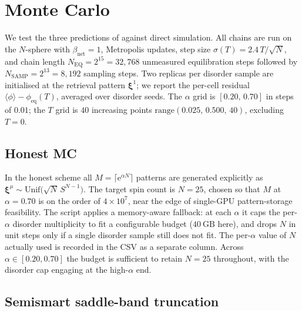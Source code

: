 \documentclass[11pt]{article}
\newcommand{\bxi}{\boldsymbol{\xi}}
\newcommand{\avg}[1]{\langle #1 \rangle}
\newcommand{\e}{{\mathrm{e}}}
\newcommand{\Bnet}{\beta_{\mathrm{net}}}
\newcommand{\phieq}{\phi_{\mathrm{eq}}}
\begin{document}
\section{Monte Carlo}
\label{sec:mc}

We test the three predictions of  against direct
simulation. All chains are run on the $N$-sphere with $\Bnet = 1$,
Metropolis updates, step size $\sigma(T) = 2.4\,T/\sqrt{N}$, and chain
length $N_{\mathrm{EQ}} = 2^{15} = 32{,}768$ unmeasured equilibration steps
followed by $N_{\mathrm{SAMP}} = 2^{13} = 8{,}192$ sampling steps. Two
replicas per disorder sample are initialised at the retrieval pattern
$\bxi^1$; we report the per-cell residual
$\avg{\phi} - \phieq(T)$, averaged over disorder seeds. The $\alpha$ grid
is $[0.20,\,0.70]$ in steps of $0.01$; the $T$ grid is $40$ increasing
points $\mathrm{range}(0.025,\,0.500,\,40)$, excluding $T=0$.

\subsection{Honest MC}
\label{sec:mc:honest}

In the honest scheme all $M = \lceil \e^{\alpha N}\rceil$ patterns are
generated explicitly as $\bxi^\mu \sim \mathrm{Unif}\bigl(\sqrt{N}\,
S^{N-1}\bigr)$. The target spin count is $N = 25$, chosen so that
$M$ at $\alpha = 0.70$ is on the order of $4\times10^7$, near the
edge of single-GPU pattern-storage feasibility. The script applies a
memory-aware fallback: at each $\alpha$ it caps the per-$\alpha$ disorder
multiplicity to fit a configurable budget ($40~\mathrm{GB}$ here), and
drops $N$ in unit steps only if a single disorder sample still does not
fit. The per-$\alpha$ value of $N$ actually used is recorded in the CSV
as a separate column. Across $\alpha \in [0.20, 0.70]$ the budget is
sufficient to retain $N = 25$ throughout, with the disorder cap engaging
at the high-$\alpha$ end.

\subsection{Semismart saddle-band truncation}
\label{sec:mc:semismart}
\end{document}
